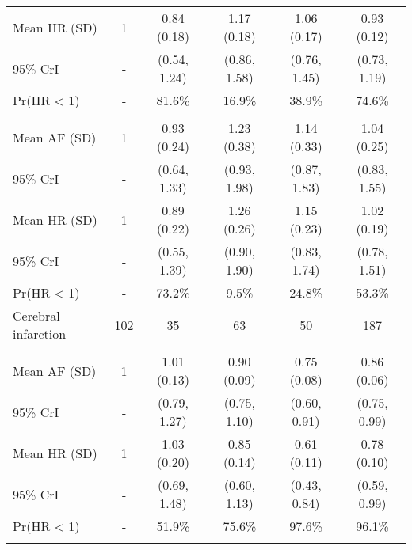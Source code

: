 \documentclass[nutrients,article,submitted,moreauthors,pdftex]{Definitions/mdpi}
\begin{document}
\begin{table}[H]
{\begin{tabular}[t]{lccccc}
\rowcolor{gray!6}  \hspace{1em}Mean HR (SD) & 1 & 0.84 (0.18) & 1.17 (0.18) & 1.06 (0.17) & 0.93 (0.12)\\
\hspace{1em}95\% CrI & - & (0.54, 1.24) & (0.86, 1.58) & (0.76, 1.45) & (0.73, 1.19)\\
\rowcolor{gray!6}  \hspace{1em}Pr(HR < 1) & - & 81.6\% & 16.9\% & 38.9\% & 74.6\%\\
\addlinespace[0.3em]
\multicolumn{6}{l}{\textbf{Model 2}}\\
\hspace{1em}Mean AF (SD) & 1 & 0.93 (0.24) & 1.23 (0.38) & 1.14 (0.33) & 1.04 (0.25)\\
\rowcolor{gray!6}  \hspace{1em}95\% CrI & - & (0.64, 1.33) & (0.93, 1.98) & (0.87, 1.83) & (0.83, 1.55)\\
\hspace{1em}Mean HR (SD) & 1 & 0.89 (0.22) & 1.26 (0.26) & 1.15 (0.23) & 1.02 (0.19)\\
\rowcolor{gray!6}  \hspace{1em}95\% CrI & - & (0.55, 1.39) & (0.90, 1.90) & (0.83, 1.74) & (0.78, 1.51)\\
\hspace{1em}Pr(HR < 1) & - & 73.2\% & 9.5\% & 24.8\% & 53.3\%\\
\hline
\rowcolor{gray!6}  Cerebral infarction & 102 & 35 & 63 & 50 & 187\\
\addlinespace[0.3em]
\multicolumn{6}{l}{\textbf{Model 0}}\\
\hspace{1em}Mean AF (SD) & 1 & 1.01 (0.13) & 0.90 (0.09) & 0.75 (0.08) & 0.86 (0.06)\\
\rowcolor{gray!6}  \hspace{1em}95\% CrI & - & (0.79, 1.27) & (0.75, 1.10) & (0.60, 0.91) & (0.75, 0.99)\\
\hspace{1em}Mean HR (SD) & 1 & 1.03 (0.20) & 0.85 (0.14) & 0.61 (0.11) & 0.78 (0.10)\\
\rowcolor{gray!6}  \hspace{1em}95\% CrI & - & (0.69, 1.48) & (0.60, 1.13) & (0.43, 0.84) & (0.59, 0.99)\\
\hspace{1em}Pr(HR < 1) & - & 51.9\% & 75.6\% & 97.6\% & 96.1\%\\
\addlinespace[0.3em]
\multicolumn{6}{l}{\textbf{Model 1}}\\

\end{tabular}}
\end{table}
\end{document}
